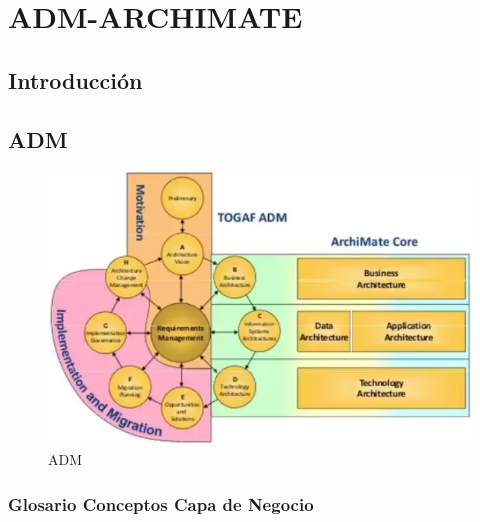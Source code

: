 \section{ADM-ARCHIMATE}
\subsection{Introducción}
\newpage

\subsection{ADM}

\begin{figure}[th!]
	\centering
	\includegraphics[width=0.7\linewidth]{arquitectura/adm_lenguaje/imgs/adm}
	\caption{ADM}
	\label{fig:adm}
\end{figure}

\newpage

\subsubsection{Glosario Conceptos Capa de Negocio}


